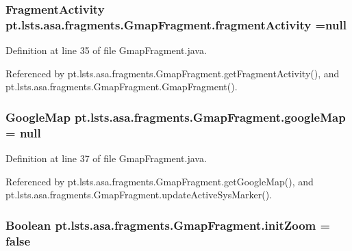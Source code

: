 \subsubsection[{fragment\+Activity}]{\setlength{\rightskip}{0pt plus 5cm}Fragment\+Activity pt.\+lsts.\+asa.\+fragments.\+Gmap\+Fragment.\+fragment\+Activity =null\hspace{0.3cm}{\ttfamily [private]}}\label{classpt_1_1lsts_1_1asa_1_1fragments_1_1GmapFragment_a53da1ea1f7df545a178174db9401a07e}


Definition at line 35 of file Gmap\+Fragment.\+java.



Referenced by pt.\+lsts.\+asa.\+fragments.\+Gmap\+Fragment.\+get\+Fragment\+Activity(), and pt.\+lsts.\+asa.\+fragments.\+Gmap\+Fragment.\+Gmap\+Fragment().

\hypertarget{classpt_1_1lsts_1_1asa_1_1fragments_1_1GmapFragment_a4fda85fb2f7c977b51c476e6ddd2951f}{}
\subsubsection[{google\+Map}]{\setlength{\rightskip}{0pt plus 5cm}Google\+Map pt.\+lsts.\+asa.\+fragments.\+Gmap\+Fragment.\+google\+Map = null\hspace{0.3cm}{\ttfamily [private]}}\label{classpt_1_1lsts_1_1asa_1_1fragments_1_1GmapFragment_a4fda85fb2f7c977b51c476e6ddd2951f}


Definition at line 37 of file Gmap\+Fragment.\+java.



Referenced by pt.\+lsts.\+asa.\+fragments.\+Gmap\+Fragment.\+get\+Google\+Map(), and pt.\+lsts.\+asa.\+fragments.\+Gmap\+Fragment.\+update\+Active\+Sys\+Marker().

\hypertarget{classpt_1_1lsts_1_1asa_1_1fragments_1_1GmapFragment_a91796464e380fcd7dacfe95fa2d19883}{}
\subsubsection[{init\+Zoom}]{\setlength{\rightskip}{0pt plus 5cm}Boolean pt.\+lsts.\+asa.\+fragments.\+Gmap\+Fragment.\+init\+Zoom = false\hspace{0.3cm}{\ttfamily [private]}}\label{classpt_1_1lsts_1_1asa_1_1fragments_1_1GmapFragment_a91796464e380fcd7dacfe95fa2d19883}


